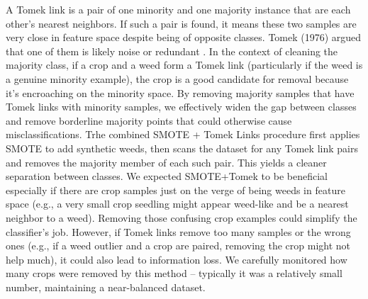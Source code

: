 \documentclass[agriengineering,article,submit,pdftex,moreauthors]{Definitions/mdpi}
\begin{document}
A Tomek link is a pair of one minority and one majority instance that are each other’s nearest neighbors.  If such a pair is found, it means these two samples are very close in feature space despite being of opposite classes. Tomek (1976) argued that one of them is likely noise or redundant \cite{Tomek1976-bg}. In the context of cleaning the majority class, if a crop and a weed form a Tomek link (particularly if the weed is a genuine minority example), the crop is a good candidate for removal because it’s encroaching on the minority space. By removing majority samples that have Tomek links with minority samples, we effectively widen the gap between classes and remove borderline majority points that could otherwise cause misclassifications. Trhe combined SMOTE + Tomek Links procedure first applies SMOTE to add synthetic weeds, then scans the dataset for any Tomek link pairs and removes the majority member of each such pair. This yields a cleaner separation between classes. We expected SMOTE+Tomek to be beneficial especially if there are crop samples just on the verge of being weeds in feature space (e.g., a very small crop seedling might appear weed-like and be a nearest neighbor to a weed). Removing those confusing crop examples could simplify the classifier’s job. However, if Tomek links remove too many samples or the wrong ones (e.g., if a weed outlier and a crop are paired, removing the crop might not help much), it could also lead to information loss. We carefully monitored how many crops were removed by this method – typically it was a relatively small number, maintaining a near-balanced dataset.
\end{document}
